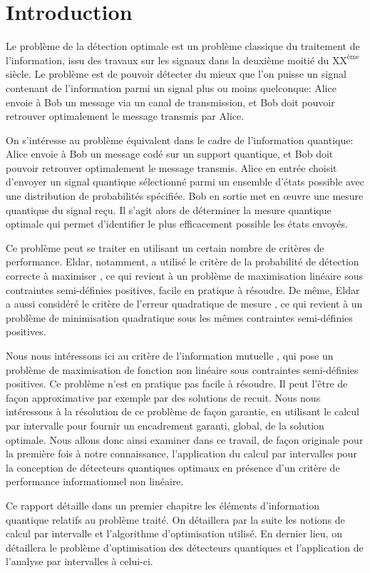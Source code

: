 \chapter{Introduction}

Le problème de la détection optimale est un problème classique du traitement de l'information, issu des travaux sur les signaux dans la deuxième moitié du $\text{XX}^{\text{ème}}$ siècle. Le problème est de pouvoir détecter du mieux que l'on puisse un signal contenant de l'information parmi un signal plus ou moins quelconque: Alice envoie à Bob un message via un canal de transmission, et Bob doit pouvoir retrouver optimalement le message transmis par Alice.

On s'intéresse au problème équivalent dans le cadre de l'information quantique: Alice envoie à Bob un message codé sur un support quantique, et Bob doit pouvoir retrouver optimalement le message transmis. 
Alice en entrée choisit d'envoyer un signal quantique sélectionné parmi un ensemble d'états possible avec une distribution de probabilités spécifiée. Bob en sortie met en \oe uvre une mesure quantique du signal reçu. Il s'agit alors de déterminer la mesure quantique optimale qui permet d'identifier le plus efficacement possible les états envoyés.

Ce problème peut se traiter en utilisant un certain nombre de critères de performance. Eldar, notamment, a utilisé le critère de la probabilité de détection correcte à maximiser \cite{Eldar03c}, ce qui revient à un problème de maximisation linéaire sous contraintes semi-définies positives, facile en pratique à résoudre. De même, Eldar a aussi considéré le critère de l'erreur quadratique de mesure \cite{Eldar01}, ce qui revient à un problème de minimisation quadratique sous les mêmes contraintes semi-définies positives.

Nous nous intéressons ici au critère de l'information mutuelle \cite{Davies78}, qui pose un problème de maximisation de fonction non linéaire sous contraintes semi-définies positives. Ce problème n'est en pratique pas facile à résoudre. Il peut l'être de façon approximative par exemple par des solutions de recuit. Nous nous intéressons à la résolution de ce problème de façon garantie, en utilisant le calcul par intervalle pour fournir un encadrement garanti, global, de la solution optimale. Nous allons donc ainsi examiner dans ce travail, de façon originale pour la première fois à notre connaissance, l'application du calcul par intervalles pour la conception de détecteurs quantiques optimaux en présence d'un critère de performance informationnel non linéaire.

Ce rapport détaille dans un premier chapitre les éléments d'information quantique relatifs au problème traité. On détaillera par la suite les notions de calcul par intervalle et l'algorithme d'optimisation utilisé. En dernier lieu, on détaillera le problème d'optimisation des détecteurs quantiques et l'application de l'analyse par intervalles à celui-ci.